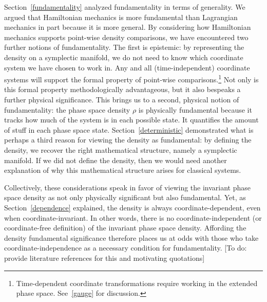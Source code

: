 \documentclass[letterpaper]{article}
\begin{document}

Section~\ref{fundamentality} analyzed fundamentality in terms of generality. We argued that Hamiltonian mechanics is more fundamental than Lagrangian mechanics in part because it is more general. By considering how Hamiltonian mechanics supports point-wise density comparisons, we have encountered two further notions of fundamentality. The first is epistemic: by representing the density on a symplectic manifold, we do not need to know which coordinate system we have chosen to work in. Any and all (time-independent) coordinate systems will support the formal property of point-wise comparisons.\footnote{Time-dependent coordinate transformations require working in the extended phase space. See~\ref{gauge} for discussion.} Not only is this formal property methodologically advantageous, but it also bespeaks a further physical significance. This brings us to a second, physical notion of fundamentality: the phase space density $\rho$ is physically fundamental because it tracks how much of the system is in each possible state. It quantifies the amount of stuff in each phase space state. Section~\ref{deterministic} demonstrated what is perhaps a third reason for viewing the density as fundamental: by defining the density, we recover the right mathematical structure, namely a symplectic manifold. If we did not define the density, then we would need another explanation of why this mathematical structure arises for classical systems. 

Collectively, these considerations speak in favor of viewing the invariant phase space density as not only physically significant but also fundamental. Yet, as Section~\ref{dependence} explained, the density is always coordinate-dependent, even when coordinate-invariant. In other words, there is no coordinate-independent (or coordinate-free definition) of the invariant phase space density. Affording the density fundamental significance therefore places us at odds with those who take coordinate-independence as a necessary condition for fundamentality. [To do: provide literature references for this and motivating quotations]
\end{document}
